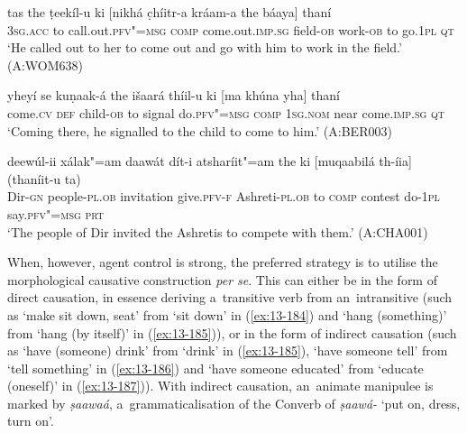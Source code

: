 \begin{exe}
\ex
\label{ex:13-181}
\gll tas the ṭeekíl-u ki [nikhá c̣híitr-a  kráam-a the báaya] thaní \\
\textsc{3sg.acc} to call.out.\textsc{pfv"=msg} \textsc{comp} come.out.\textsc{imp.sg} field-\textsc{ob}  work-\textsc{ob} to go.\textsc{1pl} \textsc{qt} \\
\glt `He called out to her to come out and go with him to work in the field.' (A:WOM638)

\ex
\label{ex:13-182}
\gll yheyí se kuṇaak-á the išaará thíil-u  ki [ma khúna yha] thaní \\
come.\textsc{cv} \textsc{def} child-\textsc{ob} to signal do.\textsc{pfv"=msg} \textsc{comp} \textsc{1sg.nom} near come.\textsc{imp.sg} \textsc{qt} \\
\glt `Coming there, he signalled to the child to come to him.' (A:BER003)

\ex
\label{ex:13-183}
\gll deewúl-ii xálak"=am daawát dít-i  atsharíit"=am the ki [muqaabilá
  th-íia]  (thaníit-u ta) \\
Dir-\textsc{gn}  people-\textsc{pl.ob} invitation give.\textsc{pfv-f} Ashreti-\textsc{pl.ob} to \textsc{comp} contest do-\textsc{1pl} say.\textsc{pfv"=msg} \textsc{prt} \\
\glt `The people of Dir invited the Ashretis to compete with them.' (A:CHA001) 
\end{exe}

When, however, agent control is strong, the preferred strategy is to utilise the morphological causative construction \textit{per se}. This can either be in the form of direct causation, in essence deriving a~transitive verb from an~intransitive (such as `make sit down, seat' from `sit down' in (\ref{ex:13-184}) and `hang (something)' from `hang (by itself)' in (\ref{ex:13-185})), or in the form of indirect causation (such as `have (someone) drink' from `drink' in (\ref{ex:13-185}), `have someone tell' from `tell something' in (\ref{ex:13-186}) and `have someone educated' from `educate (oneself)' in (\ref{ex:13-187})). With indirect causation, an~animate manipulee is marked by \textit{ṣaawaá}, a~grammaticalisation of the Converb of \textit{ṣaawá-} `put on, dress, turn on'.

